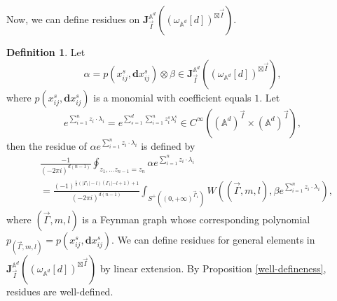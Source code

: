 \documentclass[11pt]{amsart}
\theoremstyle{definition}
\newtheorem{defn}[thm]{Definition}
\theoremstyle{remark}
\numberwithin{equation}{section}
\begin{document}
Now, we can define residues on $\mathbf{J}_{\vec{I}}^{\mathbb{A}^{d}}((\omega_{\mathbb{A}^{d}}[d])^{\boxtimes\vec{I}})$.

\begin{defn}
    Let
    $$
    \alpha=p(x_{ij}^{s},\mathbf{d}x_{ij}^{s})\otimes\beta\in \mathbf{J}_{\vec{I}}^{\mathbb{A}^{d}}((\omega_{\mathbb{A}^{d}}[d])^{\boxtimes\vec{I}}),
    $$
    where $p(x_{ij}^{s},\mathbf{d}x_{ij}^{s})$ is a monomial with coefficient equals $1$. Let
    $$
    e^{\sum_{i=1}^{n}z_{i}\cdot\lambda_{i}}=e^{\sum_{s=1}^{d}\sum_{i=1}^{n}z^{s}_{i}\lambda^{s}_{i}}\in C^{\infty}((\mathbb{A}^{d})^{\vec{I}}\times (\mathbb{A}^{d})^{\vec{I}}),
    $$
    then the residue of $\alpha e^{\sum_{i=1}^{n}z_{i}\cdot\lambda_{i}}$ is defined by
    \begin{align*}
        &\frac{-1}{(-2\pi i)^{d(n-1)}}\oint_{z_{1},\dots z_{n-1}=z_{n}}\alpha e^{\sum_{i=1}^{n}z_{i}\cdot\lambda_{i}}\\
        &=\frac{(-1)^{\frac{1}{2}(|\Gamma_{1}|-l)(\Gamma_{1}|-l+1)+1}}{(-2\pi i)^{d(n-1)}}\int_{S^{+}((0,+\infty)^{\vec{\Gamma}_{1}})}W((\vec{\Gamma},m,l),\beta e^{\sum_{i=1}^{n}z_{i}\cdot\lambda_{i}}),
    \end{align*}
    where $(\vec{\Gamma},m,l)$ is a Feynman graph whose corresponding polynomial $p_{(\vec{\Gamma},m,l)}=p(x_{ij}^{s},\mathbf{d}x_{ij}^{s})$. We can define residues for general elements in $\mathbf{J}_{\vec{I}}^{\mathbb{A}^{d}}((\omega_{\mathbb{A}^{d}}[d])^{\boxtimes\vec{I}})$ by linear extension. By Proposition \ref{well-defineness}, residues are well-defined.
\end{defn}
\end{document}
